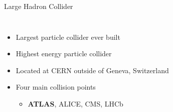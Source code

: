 \documentclass[aspectratio=169,xcolor=table]{beamer}
\begin{document}
    \begin{frame}[t]{Large Hadron Collider}
      \begin{columns}[t]
          \begin{itemize}
            \item Largest particle collider ever built
            \item Highest energy particle collider
            \item Located at CERN outside of Geneva, Switzerland
            \item Four main collision points
            \begin{itemize}
              \item \textbf{ATLAS}, ALICE, CMS, LHCb
            \end{itemize}
          \end{itemize}
          \centering


\end{columns}
\end{frame}
\end{document}
